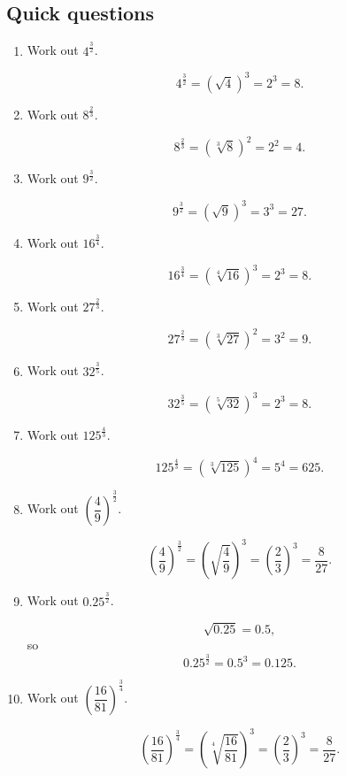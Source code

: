 \documentclass[11pt]{article}
\begin{document}
\subsection*{Quick questions}
\begin{enumerate}
\item Work out $4^{\frac{3}{2}}$.

\[
4^{\frac{3}{2}}=\left(\sqrt{4}\right)^3=2^3=8.
\]

\item Work out $8^{\frac{2}{3}}$.

\[
8^{\frac{2}{3}}=\left(\sqrt[3]{8}\right)^2=2^2=4.
\]

\item Work out $9^{\frac{3}{2}}$.

\[
9^{\frac{3}{2}}=\left(\sqrt{9}\right)^3=3^3=27.
\]

\item Work out $16^{\frac{3}{4}}$.

\[
16^{\frac{3}{4}}=\left(\sqrt[4]{16}\right)^3=2^3=8.
\]

\item Work out $27^{\frac{2}{3}}$.

\[
27^{\frac{2}{3}}=\left(\sqrt[3]{27}\right)^2=3^2=9.
\]

\item Work out $32^{\frac{3}{5}}$.

\[
32^{\frac{3}{5}}=\left(\sqrt[5]{32}\right)^3=2^3=8.
\]

\item Work out $125^{\frac{4}{3}}$.

\[
125^{\frac{4}{3}}=\left(\sqrt[3]{125}\right)^4=5^4=625.
\]

\item Work out $\left(\dfrac{4}{9}\right)^{\frac{3}{2}}$.

\[
\left(\frac{4}{9}\right)^{\frac{3}{2}}
=\left(\sqrt{\frac{4}{9}}\right)^3
=\left(\frac{2}{3}\right)^3
=\frac{8}{27}.
\]

\item Work out $0.25^{\frac{3}{2}}$.

\[
\sqrt{0.25}=0.5,
\]
so
\[
0.25^{\frac{3}{2}}=0.5^3=0.125.
\]

\item Work out $\left(\dfrac{16}{81}\right)^{\frac{3}{4}}$.

\[
\left(\frac{16}{81}\right)^{\frac{3}{4}}
=\left(\sqrt[4]{\frac{16}{81}}\right)^3
=\left(\frac{2}{3}\right)^3
=\frac{8}{27}.
\]
\end{enumerate}
\end{document}
